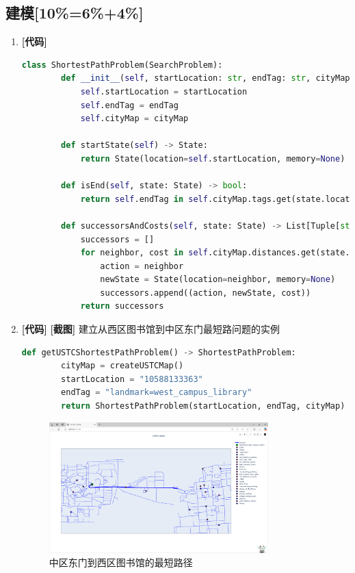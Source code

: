 \documentclass{article}
\begin{document}
\subsection{建模[10\%=6\%+4\%]}

\begin{enumerate}[label=(\alph*), start=1]
    \item \textbf{[代码]} %
    \begin{lstlisting}[language=Python]
    class ShortestPathProblem(SearchProblem):
    	def __init__(self, startLocation: str, endTag: str, cityMap: CityMap):
    		self.startLocation = startLocation
    		self.endTag = endTag
    		self.cityMap = cityMap
    
    	def startState(self) -> State:
    		return State(location=self.startLocation, memory=None)
    
    	def isEnd(self, state: State) -> bool:
    		return self.endTag in self.cityMap.tags.get(state.location, [])
    
    	def successorsAndCosts(self, state: State) -> List[Tuple[str, State, float]]:
    		successors = []
    		for neighbor, cost in self.cityMap.distances.get(state.location, {}).items():
    			action = neighbor
    			newState = State(location=neighbor, memory=None)
    			successors.append((action, newState, cost))
    		return successors
    \end{lstlisting}

    \item \textbf{[代码]} \textbf{[截图]} %
    建立从西区图书馆到中区东门最短路问题的实例
    \begin{lstlisting}[language=Python]
    def getUSTCShortestPathProblem() -> ShortestPathProblem:
    	cityMap = createUSTCMap()
    	startLocation = "10588133363"
    	endTag = "landmark=west_campus_library"
    	return ShortestPathProblem(startLocation, endTag, cityMap)
    \end{lstlisting}
    \begin{figure}[h]
    	\centering
    	\includegraphics[width=0.8\textwidth]{library_to_gate.png}
    	\caption{中区东门到西区图书馆的最短路径}
    \end{figure}
    
    
\end{enumerate}
\end{document}
